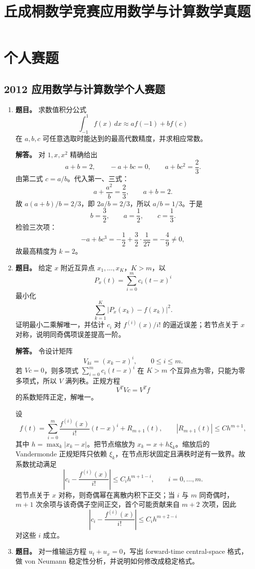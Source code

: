 ﻿\documentclass[UTF8,12pt]{ctexart}
\title{丘成桐数学竞赛应用数学与计算数学真题}
\author{}
\date{}
\begin{document}
\maketitle
\tableofcontents
\newpage

\section{个人赛题}
\subsection{2012 应用数学与计算数学个人赛题}
\begin{enumerate}[label=\textbf{\arabic*.},leftmargin=2.2em]
\item \textbf{题目。} 求数值积分公式
\[
\int_{-1}^1 f(x)\,dx\approx a f(-1)+b f(c)
\]
在 \(a,b,c\) 可任意选取时能达到的最高代数精度，并求相应常数。

\textbf{解答。} 对 \(1,x,x^2\) 精确给出
\[
a+b=2,\qquad -a+bc=0,\qquad a+bc^2=\frac23.
\]
由第二式 \(c=a/b\)。代入第一、三式：
\[
a+\frac{a^2}{b}=\frac23,\qquad a+b=2.
\]
故 \(a(a+b)/b=2/3\)，即 \(2a/b=2/3\)，所以 \(a/b=1/3\)。于是
\[
b=\frac32,\qquad a=\frac12,\qquad c=\frac13.
\]
检验三次项：
\[
-a+bc^3=-\frac12+\frac32\cdot\frac1{27}=-\frac49\ne0,
\]
故最高精度为 \(k=2\)。

\item \textbf{题目。} 给定 \(x\) 附近互异点 \(x_1,\ldots,x_K\)，\(K>m\)，以
\[
P_x(t)=\sum_{i=0}^m c_i(t-x)^i
\]
最小化
\[
\sum_{k=1}^K |P_x(x_k)-f(x_k)|^2.
\]
证明最小二乘解唯一，并估计 \(c_i\) 对 \(f^{(i)}(x)/i!\) 的逼近误差；若节点关于 \(x\) 对称，说明同奇偶项误差提高一阶。

\textbf{解答。} 令设计矩阵
\[
V_{ki}=(x_k-x)^i,\qquad 0\le i\le m.
\]
若 \(Vc=0\)，则多项式 \(\sum_{i=0}^m c_i(t-x)^i\) 在 \(K>m\) 个互异点为零，只能为零多项式，所以 \(V\) 满列秩。正规方程
\[
V^TVc=V^Tf
\]
的系数矩阵正定，解唯一。

设
\[
f(t)=\sum_{i=0}^m \frac{f^{(i)}(x)}{i!}(t-x)^i+R_{m+1}(t),
\qquad |R_{m+1}(t)|\le C h^{m+1},
\]
其中 \(h=\max_k|x_k-x|\)。把节点缩放为 \(x_k=x+h\xi_k\)。缩放后的 Vandermonde 正规矩阵只依赖 \(\xi_k\)，在节点形状固定且满秩时逆有一致界。故系数扰动满足
\[
|c_i-\frac{f^{(i)}(x)}{i!}|\le C_i h^{m+1-i},\qquad i=0,\ldots,m.
\]
若节点关于 \(x\) 对称，则奇偶幂在离散内积下正交；当 \(i\) 与 \(m\) 同奇偶时，\(m+1\) 次余项与该奇偶子空间正交，首个可能贡献来自 \(m+2\) 次项，因此
\[
|c_i-\frac{f^{(i)}(x)}{i!}|\le C_i h^{m+2-i}
\]
对这些 \(i\) 成立。

\item \textbf{题目。} 对一维输运方程 \(u_t+u_x=0\)，写出 forward-time central-space 格式，做 von Neumann 稳定性分析，并说明如何修改成稳定格式。


\end{enumerate}
\end{document}
